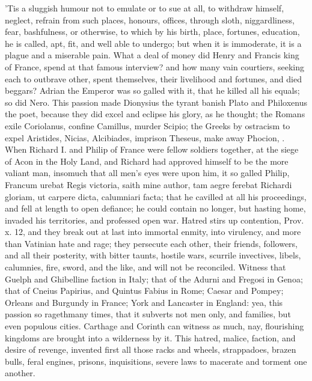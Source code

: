{'Tis a sluggish humour not to emulate or to sue at all, to withdraw
himself, neglect, refrain from such places, honours, offices, through
sloth, niggardliness, fear, bashfulness, or otherwise, to which by his
birth, place, fortunes, education, he is called, apt, fit, and well
able to undergo; but when it is immoderate, it is a plague and a
miserable pain. What a deal of money did Henry  and Francis 
king of France, spend at that famous interview? and how many vain
courtiers, seeking each to outbrave other, spent themselves, their
livelihood and fortunes, and died beggars? Adrian the Emperor was
so galled with it, that he killed all his equals; so did Nero. This
passion made Dionysius the tyrant banish Plato and Philoxenus the
poet, because they did excel and eclipse his glory, as he thought; the
Romans exile Coriolanus, confine Camillus, murder Scipio; the Greeks by
ostracism to expel Aristides, Nicias, Alcibiades, imprison Theseus,
make away Phocion, \etc{}. When Richard I. and Philip of France were fellow
soldiers together, at the siege of Acon in the Holy Land, and Richard
had approved himself to be the more valiant man, insomuch that all
men's eyes were upon him, it so galled Philip, Francum urebat Regis
victoria, saith mine author, tam aegre ferebat Richardi gloriam,
ut carpere dicta, calumniari facta; that he cavilled at all his
proceedings, and fell at length to open defiance; he could contain no
longer, but hasting home, invaded his territories, and professed open
war. Hatred stirs up contention, Prov. x. 12, and they break out at
last into immortal enmity, into virulency, and more than Vatinian hate
and rage; they persecute each other, their friends, followers,
and all their posterity, with bitter taunts, hostile wars, scurrile
invectives, libels, calumnies, fire, sword, and the like, and will not
be reconciled. Witness that Guelph and Ghibelline faction in Italy;
that of the Adurni and Fregosi in Genoa; that of Cneius Papirius, and
Quintus Fabius in Rome; Caesar and Pompey; Orleans and Burgundy in
France; York and Lancaster in England: yea, this passion so
ragethmany times, that it subverts not men only, and families,
but even populous cities. Carthage and Corinth can witness as
much, nay, flourishing kingdoms are brought into a wilderness by it.
This hatred, malice, faction, and desire of revenge, invented first all
those racks and wheels, strappadoes, brazen bulls, feral engines,
prisons, inquisitions, severe laws to macerate and torment one another.
}
